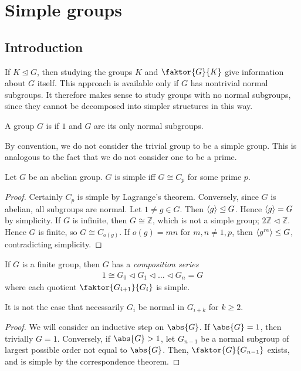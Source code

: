 \section{Simple groups}

\subsection{Introduction}
If $K \trianglelefteq G$, then studying the groups $K$ and $\faktor{G}{K}$ give information about $G$ itself.
This approach is available only if $G$ has nontrivial normal subgroups.
It therefore makes sense to study groups with no normal subgroups, since they cannot be decomposed into simpler structures in this way.

\begin{definition}
	A group $G$ is  if $\qty{1}$ and $G$ are its only normal subgroups.
\end{definition}

By convention, we do not consider the trivial group to be a simple group.
This is analogous to the fact that we do not consider one to be a prime.

\begin{lemma}
	Let $G$ be an abelian group.
	$G$ is simple iff $G \cong C_p$ for some prime $p$.
\end{lemma}

\begin{proof}
	Certainly $C_p$ is simple by Lagrange's theorem.
	Conversely, since $G$ is abelian, all subgroups are normal.
	Let $1 \neq g \in G$.
	Then $\left\langle{} g \right\rangle \trianglelefteq G$.
	Hence $\left\langle{} g \right\rangle = G$ by simplicity.
	If $G$ is infinite, then $G \cong \mathbb Z$, which is not a simple group; $2\mathbb Z \triangleleft \mathbb Z$.
	Hence $G$ is finite, so $G \cong C_{o(g)}$.
	If $o(g) = mn$ for $m, n \neq 1, p$, then $\left\langle{} g^m \right\rangle \leq G$, contradicting simplicity.
\end{proof}

\begin{lemma}
	If $G$ is a finite group, then $G$ has a \textit{composition series}
	\begin{align*}
		1 \cong G_0 \triangleleft G_1 \triangleleft \dots \triangleleft G_n = G
	\end{align*}
	where each quotient $\faktor{G_{i+1}}{G_i}$ is simple.
\end{lemma}

\begin{remark}
	It is not the case that necessarily $G_i$ be normal in $G_{i+k}$ for $k \geq 2$.
\end{remark}

\begin{proof}
	We will consider an inductive step on $\abs{G}$.
	If $\abs{G} = 1$, then trivially $G = 1$.
	Conversely, if $\abs{G} > 1$, let $G_{n-1}$ be a normal subgroup of largest possible order not equal to $\abs{G}$.
	Then, $\faktor{G}{G_{n-1}}$ exists, and is simple by the correspondence theorem.
\end{proof}
